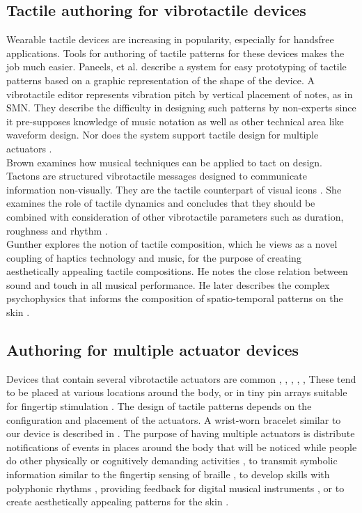 \documentclass[a4paper, twocolumn]{article}
\begin{document}
\subsection{Tactile authoring for vibrotactile devices}
Wearable tactile devices are increasing in popularity, especially for handsfree applications. Tools for authoring of tactile patterns for these devices makes the job much easier. Paneels, et al. describe a system for easy prototyping of tactile patterns based on a graphic representation of the shape of the device. A vibrotactile editor represents vibration pitch by vertical placement of notes, as in SMN. They describe the difficulty in designing such patterns by non-experts since it pre-supposes knowledge of music notation as well as other technical area like waveform design. Nor does the system support tactile design for multiple actuators \cite{paneels2013tactiped}.\\

Brown examines how musical techniques can be applied to tact on design. Tactons are structured vibrotactile messages designed to communicate information non-visually. They are the tactile counterpart of visual icons \cite{brewster2004tactons}. She examines the role of tactile dynamics and concludes that they should be combined with consideration of other vibrotactile parameters such as duration, roughness and rhythm \cite{brown2006tactile}.\\ 

Gunther explores the notion of tactile composition, which he views as a novel coupling of haptics technology and music, for the purpose of creating aesthetically appealing tactile compositions. He notes the close relation between sound and touch in all musical performance. He later describes the complex psychophysics that informs the composition of spatio-temporal patterns on the skin  \cite{gunther2003cutaneous}. 

\subsection{Authoring for multiple actuator devices}
Devices that contain several vibrotactile actuators are common \cite{gunther2003cutaneous}, \cite{lindeman2004towards}, \cite{lindeman2006wearable}, \cite{ertan1998wearable}, \cite{brown2007tactons}, These tend to be placed at various locations around the body, or in tiny pin arrays suitable for fingertip stimulation \cite{brewster2004tactons}. The design of tactile patterns depends on the configuration and placement of the actuators. A wrist-worn bracelet similar to our device is described in \cite{paneels2013tactiped}. The purpose of having multiple actuators is distribute notifications of events in places around the body that will be noticed while people do other physically or cognitively demanding activities \cite{lindeman2006wearable}, to transmit symbolic information similar to the fingertip sensing of braille \cite{brewster2004tactons}, to develop skills with polyphonic rhythms  \cite{holland2010feeling}, providing feedback for digital musical instruments \cite{marshall2006vibrotactile} \cite{schumacher2013vibrotactile}, or to create aesthetically appealing patterns for the skin \cite{gunther2003cutaneous}.
\end{document}
